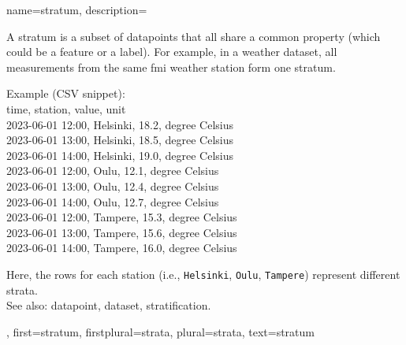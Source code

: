 {name={stratum},
	description={A stratum is a subset of \glspl{datapoint} that all 
		share a common property (which could be a \gls{feature} or a \gls{label}). 
		For example, in a weather \gls{dataset}, all measurements from the same 
		\gls{fmi} weather station form one stratum.
		\begin{center}
			Example (CSV snippet):\\
  			{\ttfamily
  			time, station, value, unit\\
  			2023-06-01 12:00, Helsinki, 18.2, degree Celsius\\
  			2023-06-01 13:00, Helsinki, 18.5, degree Celsius\\
  			2023-06-01 14:00, Helsinki, 19.0, degree Celsius\\
  			2023-06-01 12:00, Oulu, 12.1, degree Celsius\\
  			2023-06-01 13:00, Oulu, 12.4, degree Celsius\\
  			2023-06-01 14:00, Oulu, 12.7, degree Celsius\\
  			2023-06-01 12:00, Tampere, 15.3, degree Celsius\\
  			2023-06-01 13:00, Tampere, 15.6, degree Celsius\\
  			2023-06-01 14:00, Tampere, 16.0, degree Celsius
  			}
		\end{center} 
		Here, the rows for each station (i.e., \texttt{Helsinki}, \texttt{Oulu}, \texttt{Tampere}) 
		represent different strata.
		\\ 
		See also: \gls{datapoint}, \gls{dataset}, \gls{stratification}.},
  	first={stratum},
  	firstplural={strata},
 	plural={strata}, 
 	text={stratum}
}

